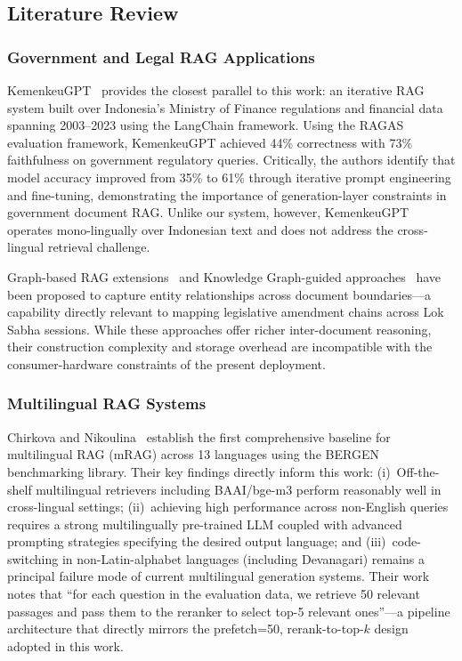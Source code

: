 \documentclass[conference]{IEEEtran}
\begin{document}
\subsection{Literature Review}

\subsubsection{Government and Legal RAG Applications}

KemenkeuGPT~\cite{kemenkeu2024} provides the closest parallel to this work:
an iterative RAG system built over Indonesia's Ministry of Finance regulations
and financial data spanning 2003--2023 using the LangChain framework.
Using the RAGAS evaluation framework, KemenkeuGPT achieved 44\% correctness
with 73\% faithfulness on government regulatory queries.
Critically, the authors identify that model accuracy improved from 35\% to
61\% through iterative prompt engineering and fine-tuning, demonstrating the
importance of generation-layer constraints in government document RAG.
Unlike our system, however, KemenkeuGPT operates mono-lingually over
Indonesian text and does not address the cross-lingual retrieval challenge.

Graph-based RAG extensions~\cite{graphrag2025,tkgrag2025} and Knowledge
Graph-guided approaches~\cite{kgrag2025} have been proposed to capture
entity relationships across document boundaries---a capability directly
relevant to mapping legislative amendment chains across Lok Sabha sessions.
While these approaches offer richer inter-document reasoning, their
construction complexity and storage overhead are incompatible with the
consumer-hardware constraints of the present deployment.

\subsubsection{Multilingual RAG Systems}

Chirkova and Nikoulina~\cite{mrag_settings2024} establish the first
comprehensive baseline for multilingual RAG (mRAG) across 13 languages
using the BERGEN benchmarking library.
Their key findings directly inform this work:
(i)~Off-the-shelf multilingual retrievers including BAAI/bge-m3 perform
reasonably well in cross-lingual settings; (ii)~achieving high performance
across non-English queries requires a strong multilingually pre-trained LLM
coupled with advanced prompting strategies specifying the desired output
language; and (iii)~code-switching in non-Latin-alphabet languages (including
Devanagari) remains a principal failure mode of current multilingual generation
systems.
Their work notes that ``for each question in the evaluation data, we retrieve
50 relevant passages and pass them to the reranker to select top-5 relevant
ones''---a pipeline architecture that directly mirrors the prefetch=50,
rerank-to-top-$k$ design adopted in this work.
\end{document}

